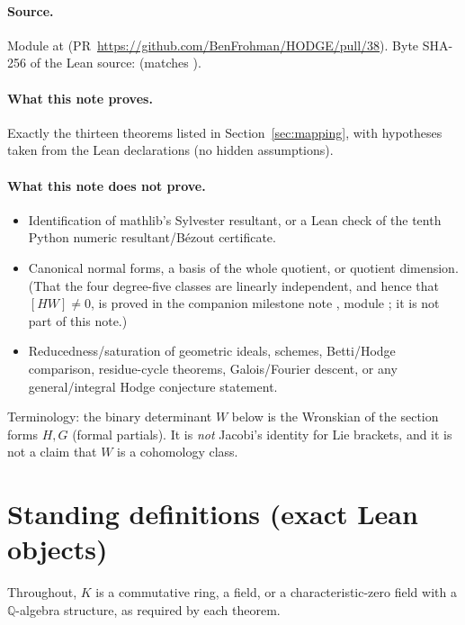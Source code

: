 \documentclass[11pt,a4paper]{article}
\newcommand{\Q}{\mathbb{Q}}
\theoremstyle{definition}
\begin{document}
\paragraph{Source.}
Module  at
(PR~\url{https://github.com/BenFrohman/HODGE/pull/38}).
Byte SHA-256 of the Lean source:
(matches ).

\paragraph{What this note proves.}
Exactly the thirteen theorems listed in Section~\ref{sec:mapping}, with
hypotheses taken from the Lean declarations (no hidden assumptions).

\paragraph{What this note does not prove.}
\begin{itemize}[leftmargin=1.4em,itemsep=0.25em]
\item Identification of mathlib's Sylvester resultant, or a Lean check of the
      tenth Python numeric resultant/B\'ezout certificate.
\item Canonical normal forms, a basis of the whole quotient, or quotient
      dimension. (That the four degree-five classes are linearly independent,
      and hence that $[HW]\neq0$, is proved in the companion milestone note
      , module
      ; it is not part of this note.)
\item Reducedness/saturation of geometric ideals, schemes, Betti/Hodge
      comparison, residue-cycle theorems, Galois/Fourier descent, or any
      general/integral Hodge conjecture statement.
\end{itemize}
Terminology: the binary determinant $W$ below is the Wronskian of the section
forms $H,G$ (formal partials). It is \emph{not} Jacobi's identity for Lie
brackets, and it is not a claim that $W$ is a cohomology class.

\section{Standing definitions (exact Lean objects)}

Throughout, $K$ is a commutative ring, a field, or a characteristic-zero field
with a $\Q$-algebra structure, as required by each theorem.
\end{document}
